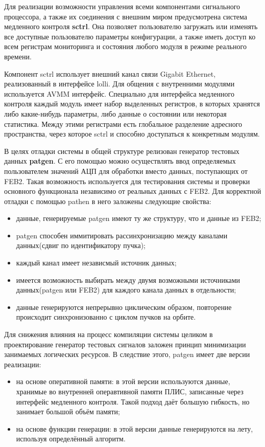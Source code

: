 Для реализации возможности управления всеми компонентами сигнального процессора, а также их соединения с внешним миром предусмотрена система медленного контроля \textbf{sctrl}. Она позволяет пользователю загружать или изменять все доступные пользователю параметры конфигурации, а также иметь доступ ко всем регистрам мониторинга и состояния любого модуля в режиме реального времени.\par
Компонент sctrl использует внешний канал связи Gigabit Ethernet, реализованный в интерфейсе lolli. Для общения с внутренними модулями используется AVMM интерфейс. Специально для интерфейса медленного контроля каждый модуль имеет набор выделенных регистров, в которых хранятся либо какие-нибудь параметры, либо данные о состоянии или некоторая статистика. Между этими регистрами есть глобальное разделение адресного пространства, через которое sctrl и способно доступаться к конкретным модулям.\par
В целях отладки системы в общей структуре релизован генератор тестовых данных \textbf{patgen}. С его помощью можно осуществлять ввод определяемых пользователем значений АЦП для обработки вместо данных, поступающих от FEB2. Такая возможность используется для тестирования системы и проверки основного функционала независимо от реальных данных с FEB2. Для корректной отладки с помощью pathen в него заложены следующие свойства:\par
\begin{itemize}
    \item данные, генерируемые patgen имеют ту же структуру, что и данные из FEB2;
    \item patgen способен иммитировать рассинхронизацию между каналами данных(сдвиг по идентификатору пучка);
    \item каждый канал имеет независмый источник данных;
    \item имеется возможность выбирать между двумя возможными источниками данных(patgen или FEB2) для каждого канала данных в отдельности;
    \item данные генерируются непрерывно циклическим образом, повторение происходит синхронизованно с циклом пучков на орбите.
\end{itemize}\par
Для снижения влияния на процесс компиляции системы целиком в проектирование генератор тестовых сигналов заложен принцип минимизации занимаемых логических ресурсов. В следствие этого, patgen имеет две версии реализации:\par
\begin{itemize}
    \item на основе оперативной памяти: в этой версии используются данные, хранимые во внутренней операвтивной памяти ПЛИС, записанные через интерфейс медленного контроля. Такой подход даёт большую гибкость, но занимает большой объём памяти;
    \item на основе функции генерации: в этой версии данные генерируются на лету, используя определённый алгоритм.
\end{itemize}\par
